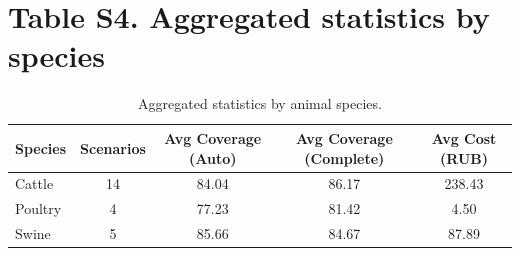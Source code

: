 \documentclass[11pt]{article}
\begin{document}
\section*{Table S4. Aggregated statistics by species}
\begin{table}[H]
\centering
\caption{Aggregated statistics by animal species.}\label{tab:s4_sp}
\begin{tabular}{lcccc}
\toprule
\textbf{Species} & \textbf{Scenarios} & \textbf{Avg Coverage (Auto)} & \textbf{Avg Coverage (Complete)} & \textbf{Avg Cost (RUB)} \\
\midrule
Cattle & 14 & 84.04 & 86.17 & 238.43 \\
Poultry & 4 & 77.23 & 81.42 & 4.50 \\
Swine & 5 & 85.66 & 84.67 & 87.89 \\
\bottomrule
\end{tabular}
\end{table}
\end{document}
